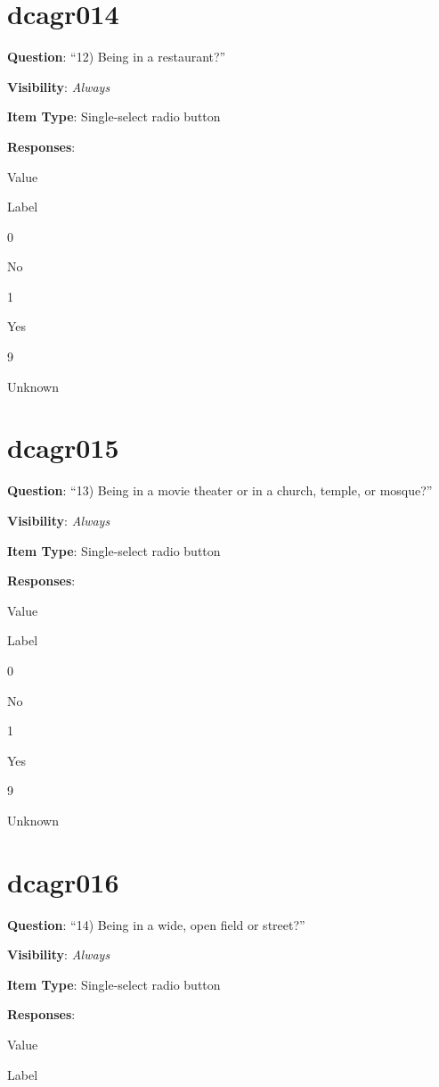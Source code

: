 \documentclass[]{book}
\begin{document}
\hypertarget{dcagr014}{%
\section{dcagr014}\label{dcagr014}}

\textbf{Question}: ``12) Being in a restaurant?''

\textbf{Visibility}: \emph{Always}

\textbf{Item Type}: Single-select radio button

\textbf{Responses}:

Value

Label

0

No

1

Yes

9

Unknown

\hypertarget{dcagr015}{%
\section{dcagr015}\label{dcagr015}}

\textbf{Question}: ``13) Being in a movie theater or in a church, temple, or mosque?''

\textbf{Visibility}: \emph{Always}

\textbf{Item Type}: Single-select radio button

\textbf{Responses}:

Value

Label

0

No

1

Yes

9

Unknown

\hypertarget{dcagr016}{%
\section{dcagr016}\label{dcagr016}}

\textbf{Question}: ``14) Being in a wide, open field or street?''

\textbf{Visibility}: \emph{Always}

\textbf{Item Type}: Single-select radio button

\textbf{Responses}:

Value

Label
\end{document}
